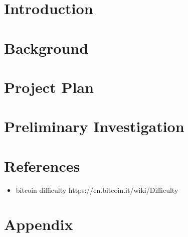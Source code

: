 





\section{Introduction}



\section{Background}



\section{Project Plan}



\section{Preliminary Investigation}




\newpage

\section{References}

\begin{itemize}
  \item bitcoin difficulty https://en.bitcoin.it/wiki/Difficulty
\end{itemize}

\printbibliography[heading=none]

\newpage

\section{Appendix}




